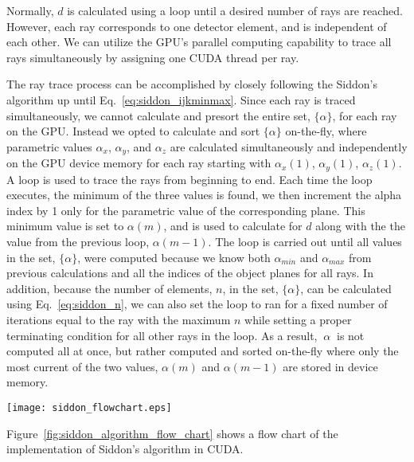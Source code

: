 Normally, $d$ is calculated using a loop until a desired number of rays are reached.  However, each ray corresponds to one detector element, and is independent of each other.  We can utilize the GPU's parallel computing capability to trace all rays simultaneously by assigning one CUDA thread per ray.

The ray trace process can be accomplished by closely following the Siddon's algorithm up until Eq.~\ref{eq:siddon_ijkminmax}.  Since each ray is traced simultaneously, we cannot calculate and presort the entire set, $\{ \alpha \}$, for each ray on the GPU.  Instead we opted to calculate and sort $\{ \alpha \}$ on-the-fly, where parametric values $\alpha_x$, $\alpha_y$, and $\alpha_z$ are calculated simultaneously and independently on the GPU device memory for each ray starting with $\alpha_x(1)$, $\alpha_y(1)$, $\alpha_z(1)$.  A loop is used to trace the rays from beginning to end.  Each time the loop executes, the minimum of the three values is found, we then increment the alpha index by 1 only for the parametric value of the corresponding plane.  This minimum value is set to $\alpha(m)$, and is used to calculate for $d$ along with the the value from the previous loop, $\alpha(m-1)$.  The loop is carried out until all values in the set, $\{ \alpha \}$, were computed because we know both $\alpha_{min}$ and $\alpha_{max}$ from previous calculations and all the indices of the object planes for all rays.  In addition, because the number of elements, $n$, in the set, $\{ \alpha \} $, can be calculated using Eq.~\ref{eq:siddon_n}, we can also set the loop to ran for a fixed number of iterations equal to the ray with the maximum $n$ while setting a proper terminating condition for all other rays in the loop.  As a result, $\ {\alpha\ }$ is not computed all at once, but rather computed and sorted on-the-fly where only the most current of the two values, $\alpha(m)$ and $\alpha(m-1)$ are stored in device memory.  
%
\begin{sidewaysfigure}
\texttt{[image: siddon\_flowchart.eps]}
\caption{The algorithm for Siddon's implementation on CUDA.}
\label{fig:siddon_algorithm_flow_chart}
\end{sidewaysfigure}
%
Figure~\ref{fig:siddon_algorithm_flow_chart} shows a flow chart of the implementation of Siddon's algorithm in CUDA.

